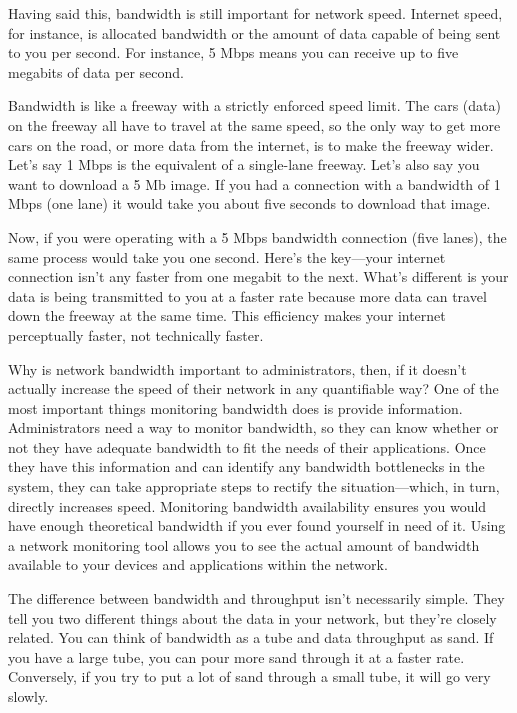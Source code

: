 Having said this, bandwidth is still important for network speed. Internet speed, for instance, is allocated bandwidth or the amount of data capable of being sent to you per second. For instance, 5 Mbps means you can receive up to five megabits of data per second.

Bandwidth is like a freeway with a strictly enforced speed limit. The cars (data) on the freeway all have to travel at the same speed, so the only way to get more cars on the road, or more data from the internet, is to make the freeway wider. Let’s say 1 Mbps is the equivalent of a single-lane freeway. Let’s also say you want to download a 5 Mb image. If you had a connection with a bandwidth of 1 Mbps (one lane) it would take you about five seconds to download that image.

Now, if you were operating with a 5 Mbps bandwidth connection (five lanes), the same process would take you one second. Here’s the key—your internet connection isn’t any faster from one megabit to the next. What’s different is your data is being transmitted to you at a faster rate because more data can travel down the freeway at the same time. This efficiency makes your internet perceptually faster, not technically faster.

Why is network bandwidth important to administrators, then, if it doesn’t actually increase the speed of their network in any quantifiable way? One of the most important things monitoring bandwidth does is provide information. Administrators need a way to monitor bandwidth, so they can know whether or not they have adequate bandwidth to fit the needs of their applications. Once they have this information and can identify any bandwidth bottlenecks in the system, they can take appropriate steps to rectify the situation—which, in turn, directly increases speed. Monitoring bandwidth availability ensures you would have enough theoretical bandwidth if you ever found yourself in need of it. Using a network monitoring tool allows you to see the actual amount of bandwidth available to your devices and applications within the network.

The difference between bandwidth and throughput isn’t necessarily simple. They tell you two different things about the data in your network, but they’re closely related. You can think of bandwidth as a tube and data throughput as sand. If you have a large tube, you can pour more sand through it at a faster rate. Conversely, if you try to put a lot of sand through a small tube, it will go very slowly.

